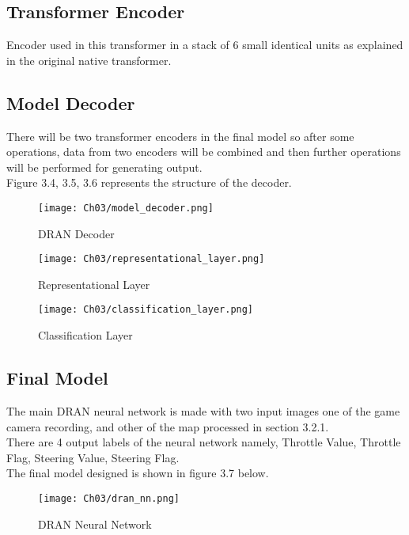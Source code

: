 \subsection{Transformer Encoder}
Encoder used in this transformer in a stack of 6 small identical units as explained in the original native transformer.

\subsection{Model Decoder}
There will be two transformer encoders in the final model so after some operations, data from two encoders will be combined and then further operations will be performed for generating output.
\\
Figure 3.4, 3.5, 3.6 represents the structure of the decoder.
\begin{figure}[h]
    \centering
    \texttt{[image: Ch03/model\_decoder.png]}
    \caption{DRAN Decoder}
    \label{figure:5}
\end{figure}
\begin{figure}[h]
    \centering
    \texttt{[image: Ch03/representational\_layer.png]}
    \caption{Representational Layer}
    \label{figure:6}
\end{figure}
\begin{figure}[h]
    \centering
    \texttt{[image: Ch03/classification\_layer.png]}
    \caption{Classification Layer}
    \label{figure:7}
\end{figure}
\FloatBarrier

\subsection{Final Model}
The main DRAN neural network is made with two input images one of the game camera recording, and other of the map processed in section 3.2.1.
\\
There are 4 output labels of the neural network namely, Throttle Value, Throttle Flag, Steering Value, Steering Flag.
\\
The final model designed is shown in figure 3.7 below.
\begin{figure}[h]
    \centering
    \texttt{[image: Ch03/dran\_nn.png]}
    \caption{DRAN Neural Network}
    \label{figure:8}
\end{figure}